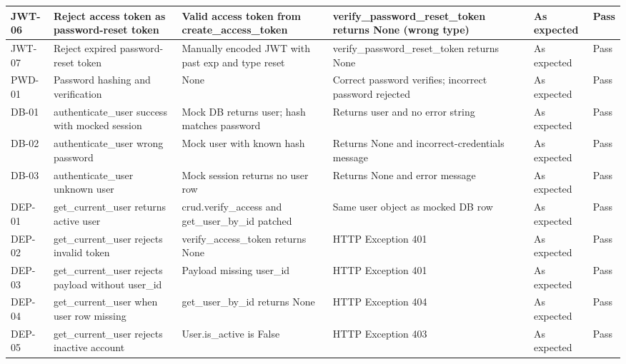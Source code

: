 \begin{appendices}
{\begin{longtable}{|p{1.2cm}|p{3.0cm}|p{2.8cm}|p{3.2cm}|p{2.2cm}|p{1.1cm}|}
JWT-06 &
Reject access token as password-reset token &
Valid access token from create\_access\_token &
verify\_password\_reset\_token returns None (wrong type) &
As expected &
Pass \\
\hline

JWT-07 &
Reject expired password-reset token &
Manually encoded JWT with past exp and type reset &
verify\_password\_reset\_token returns None &
As expected &
Pass \\
\hline

PWD-01 &
Password hashing and verification &
None &
Correct password verifies; incorrect password rejected &
As expected &
Pass \\
\hline

DB-01 &
authenticate\_user success with mocked session &
Mock DB returns user; hash matches password &
Returns user and no error string &
As expected &
Pass \\
\hline

DB-02 &
authenticate\_user wrong password &
Mock user with known hash &
Returns None and incorrect-credentials message &
As expected &
Pass \\
\hline

DB-03 &
authenticate\_user unknown user &
Mock session returns no user row &
Returns None and error message &
As expected &
Pass \\
\hline

DEP-01 &
get\_current\_user returns active user &
crud.verify\_access and get\_user\_by\_id patched &
Same user object as mocked DB row &
As expected &
Pass \\
\hline

DEP-02 &
get\_current\_user rejects invalid token &
verify\_access\_token returns None &
HTTP Exception 401 &
As expected &
Pass \\
\hline

DEP-03 &
get\_current\_user rejects payload without user\_id &
Payload missing user\_id &
HTTP Exception 401 &
As expected &
Pass \\
\hline

DEP-04 &
get\_current\_user when user row missing &
get\_user\_by\_id returns None &
HTTP Exception 404 &
As expected &
Pass \\
\hline

DEP-05 &
get\_current\_user rejects inactive account &
User.is\_active is False &
HTTP Exception 403 &
As expected &
Pass \\
\hline

\end{longtable}

}
\end{appendices}

